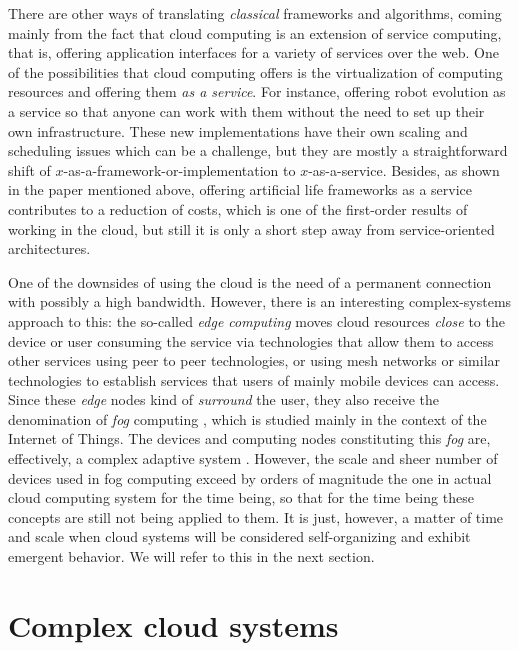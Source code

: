 \documentclass[utf8]{frontiersSCNS} %
\begin{document}
There are other ways of translating {\em classical} frameworks and
algorithms, coming mainly from the fact that cloud computing is an
extension of service computing, that is, offering application
interfaces for a variety of services over the web. One of the possibilities that cloud computing offers
is the virtualization of computing resources and offering them {\em as a
service}. For instance, offering robot evolution as a service
\citep{du2017robot,chen2010robot} so that anyone can work with them without the
need to set up their own infrastructure. These new
implementations have their own scaling and scheduling issues which can
be a challenge, but they are mostly a straightforward shift
of $x$-as-a-framework-or-implementation to $x$-as-a-service. Besides,
as shown in the paper mentioned above, offering artificial life
frameworks as a service contributes to a
reduction of costs, which is one of the first-order results of working
in the cloud, but still it is only a short step away from
service-oriented architectures.


One of the downsides of using the cloud is the need of a permanent connection
with possibly a high bandwidth. However, there is
an interesting complex-systems approach to this: the so-called {\em edge
computing} \citep{satyanarayanan2017edge} moves cloud resources {\em close} to
the device or user consuming the service via technologies that allow them to access other
services using peer to peer technologies, or using mesh networks or
similar technologies to establish services that users of mainly mobile
devices can access. Since these {\em edge} nodes kind of {\em surround} the
user, they also receive the denomination of {\em fog} computing \citep{luan2015fog}, which is studied mainly in the context of the Internet
of Things. The devices and computing nodes constituting this {\em fog}
are, effectively, a complex adaptive system
\citep{yan2010application,roca2018tackling}. However, the scale and
sheer
number of devices used in fog computing exceed by orders of magnitude
the one in actual cloud computing system for the time being, so that
for the time being these concepts are still not being applied to
them. It is just, however, a matter of time and scale when cloud
systems will be considered self-organizing and exhibit emergent
behavior. We will refer to this in the next section.


\section{Complex cloud systems }
\end{document}
